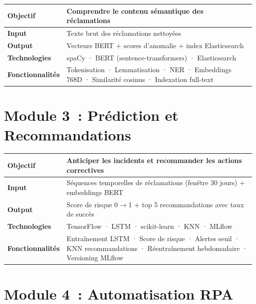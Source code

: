 \documentclass[12pt,a4paper]{report}
\begin{document}
\begin{table}[H]
\centering
\begin{tabularx}{\textwidth}{|l|X|}
\hline
\textbf{Objectif} & Comprendre le contenu sémantique des réclamations \\
\hline
\textbf{Input} & Texte brut des réclamations nettoyées \\
\hline
\textbf{Output} & Vecteurs BERT + scores d'anomalie + index Elasticsearch \\
\hline
\textbf{Technologies} & spaCy · BERT (sentence-transformers) · Elasticsearch \\
\hline
\textbf{Fonctionnalités} & Tokenisation · Lemmatisation · NER · Embeddings 768D · Similarité cosinus · Indexation full-text \\
\hline
\end{tabularx}
\end{table}

\section{Module 3~: Prédiction et Recommandations}

\begin{table}[H]
\centering
\begin{tabularx}{\textwidth}{|l|X|}
\hline
\textbf{Objectif} & Anticiper les incidents et recommander les actions correctives \\
\hline
\textbf{Input} & Séquences temporelles de réclamations (fenêtre 30 jours) + embeddings BERT \\
\hline
\textbf{Output} & Score de risque 0$\rightarrow$1 + top 5 recommandations avec taux de succès \\
\hline
\textbf{Technologies} & TensorFlow · LSTM · scikit-learn · KNN · MLflow \\
\hline
\textbf{Fonctionnalités} & Entraînement LSTM · Score de risque · Alertes seuil · KNN recommandations · Réentraînement hebdomadaire · Versioning MLflow \\
\hline
\end{tabularx}
\end{table}

\section{Module 4~: Automatisation RPA}
\end{document}
